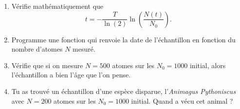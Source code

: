 \documentclass[11pt,class=report,crop=false]{standalone}
\begin{document}
\begin{activite}
\begin{enumerate}
    \begin{enumerate}
      \item Vérifie mathématiquement que 
    $$t = -\frac{T}{\ln(2)}\ln\left(\frac{N(t)}{N_0} \right).$$
    
   \item Programme une fonction 
 qui renvoie la date de l'échantillon en fonction du nombre d'atomes $N$ mesuré.

  \item Vérifie que si on mesure $N=500$ atomes sur les $N_0=1000$ initial, alors l'échantillon a bien l'âge que l'on pense.

  \item Tu as trouvé un échantillon d'une espèce disparue, l'\emph{Animagus Pythoniscus} 
avec $N=200$ atomes sur les $N_0=1000$ initial. Quand a vécu cet animal ?
  \end{enumerate}  
  \end{enumerate}   

\end{activite}
\end{document}
